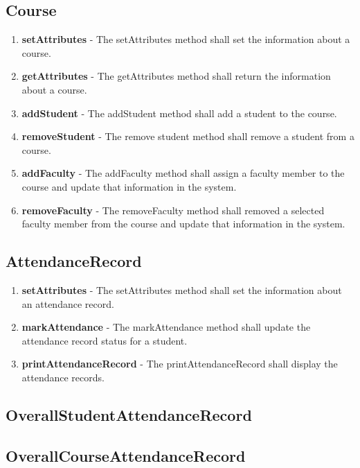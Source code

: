 \documentclass[letterpaper,12pt,oneside,listof=totoc]{scrreprt}
\begin{document}
\subsection{Course}
\begin{enumerate}
    \item \textbf{setAttributes} - The setAttributes method shall set the information about a course.
    \item \textbf{getAttributes} - The getAttributes method shall return the information about a course.
    \item \textbf{addStudent} - The addStudent method shall add a student to the course.
    \item \textbf{removeStudent} - The remove student method shall remove a student from a course.
    \item \textbf{addFaculty} - The addFaculty method shall assign a faculty member to the course and update that information in the system.
    \item \textbf{removeFaculty} - The removeFaculty method shall removed a selected faculty member from the course and update that information in the system.
\end{enumerate}

\subsection{AttendanceRecord}
\begin{enumerate}
    \item \textbf{setAttributes} - The setAttributes method shall set the information about an attendance record.
    \item \textbf{markAttendance} - The markAttendance method shall update the attendance record status for a student.
    \item \textbf{printAttendanceRecord} - The printAttendanceRecord shall display the attendance records.
\end{enumerate}

\subsection{OverallStudentAttendanceRecord}

\subsection{OverallCourseAttendanceRecord}
\end{document}
